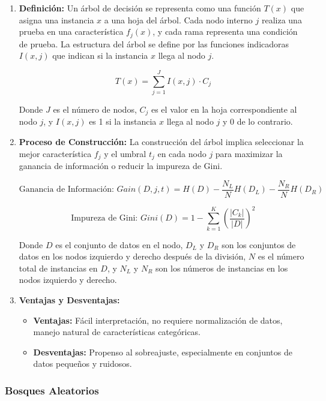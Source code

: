 \documentclass[12pt]{article}
\begin{document}
\begin{enumerate}
    \item \textbf{Definición:}
        Un árbol de decisión se representa como una función \(T(x)\) que asigna una instancia \(x\) a una hoja del árbol. Cada nodo interno \(j\) realiza una prueba en una característica \(f_j(x)\), y cada rama representa una condición de prueba. La estructura del árbol se define por las funciones indicadoras \(I(x, j)\) que indican si la instancia \(x\) llega al nodo \(j\).
        
        \[ T(x) = \sum_{j=1}^{J} I(x, j) \cdot C_j \]

        Donde \(J\) es el número de nodos, \(C_j\) es el valor en la hoja correspondiente al nodo \(j\), y \(I(x, j)\) es 1 si la instancia \(x\) llega al nodo \(j\) y 0 de lo contrario.

    \item \textbf{Proceso de Construcción:}
        La construcción del árbol implica seleccionar la mejor característica \(f_j\) y el umbral \(t_j\) en cada nodo \(j\) para maximizar la ganancia de información o reducir la impureza de Gini.
        
        \[ \textrm{Ganancia de Información: } Gain(D, j, t) = H(D) - \frac{N_L}{N} H(D_L) - \frac{N_R}{N} H(D_R) \]

        \[ \textrm{Impureza de Gini: } Gini(D) = 1 - \sum_{k=1}^{K} \left(\frac{|C_k|}{|D|}\right)^2 \]

        Donde \(D\) es el conjunto de datos en el nodo, \(D_L\) y \(D_R\) son los conjuntos de datos en los nodos izquierdo y derecho después de la división, \(N\) es el número total de instancias en \(D\), y \(N_L\) y \(N_R\) son los números de instancias en los nodos izquierdo y derecho.

    \item \textbf{Ventajas y Desventajas:}
        \begin{itemize}
            \item \textbf{Ventajas:} Fácil interpretación, no requiere normalización de datos, manejo natural de características categóricas.
            \item \textbf{Desventajas:} Propenso al sobreajuste, especialmente en conjuntos de datos pequeños y ruidosos.
        \end{itemize}
\end{enumerate}

\subsubsection{Bosques Aleatorios}
\end{document}
